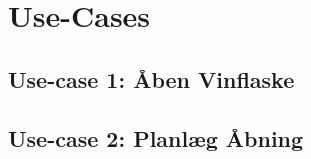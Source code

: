 
\section{Use-Cases}

\subsection{Use-case 1: Åben Vinflaske}
\label{UC1}

\pagebreak

\subsection{Use-case 2: Planlæg Åbning}
\label{UC2}
\pagebreak


\pagebreak